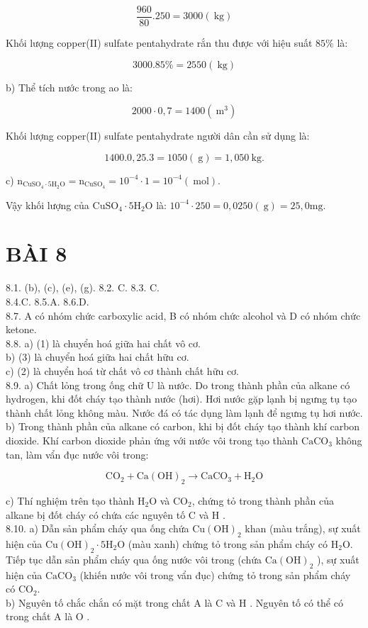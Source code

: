\documentclass[10pt]{article}
\begin{document}
$$
\frac{960}{80} .250=3000(\mathrm{~kg})
$$

Khối lượng copper(II) sulfate pentahydrate rắn thu được với hiệu suất $85 \%$ là:

$$
3000.85 \%=2550(\mathrm{~kg})
$$

b) Thể tích nước trong ao là:

$$
2000 \cdot 0,7=1400\left(\mathrm{~m}^{3}\right)
$$

Khối lượng copper(II) sulfate pentahydrate người dân cần sử dụng là:

$$
1400.0,25.3=1050(\mathrm{~g})=1,050 \mathrm{~kg} .
$$

c) $\mathrm{n}_{\mathrm{CuSO}_{4} \cdot 5 \mathrm{H}_{2} \mathrm{O}}=\mathrm{n}_{\mathrm{CuSO}_{4}}=10^{-4} \cdot 1=10^{-4}(\mathrm{~mol})$.

Vậy khối lượng của $\mathrm{CuSO}_{4} \cdot 5 \mathrm{H}_{2} \mathrm{O}$ là: $10^{-4} \cdot 250=0,0250(\mathrm{~g})=25,0 \mathrm{mg}$.

\section*{BÀI 8}
8.1. (b), (c), (e), (g). 8.2. C. 8.3. C.\\
8.4.C. 8.5.A. 8.6.D.\\
8.7. A có nhóm chức carboxylic acid, B có nhóm chức alcohol và D có nhóm chức ketone.\\
8.8. a) (1) là chuyển hoá giữa hai chất vô cơ.\\
b) (3) là chuyển hoá giữa hai chất hữu cơ.\\
c) (2) là chuyển hoá từ chất vô cơ thành chất hữu cơ.\\
8.9. a) Chất lỏng trong ống chữ U là nước. Do trong thành phần của alkane có hydrogen, khi đốt cháy tạo thành nước (hơi). Hơi nước gặp lạnh bị ngưng tụ tạo thành chất lỏng không màu. Nước đá có tác dụng làm lạnh để ngưng tụ hơi nước.\\
b) Trong thành phần của alkane có carbon, khi bị đốt cháy tạo thành khí carbon dioxide. Khí carbon dioxide phản ứng với nước vôi trong tạo thành $\mathrm{CaCO}_{3}$ không tan, làm vẩn đục nước vôi trong:

$$
\mathrm{CO}_{2}+\mathrm{Ca}(\mathrm{OH})_{2} \rightarrow \mathrm{CaCO}_{3}+\mathrm{H}_{2} \mathrm{O}
$$

c) Thí nghiệm trên tạo thành $\mathrm{H}_{2} \mathrm{O}$ và $\mathrm{CO}_{2}$, chứng tỏ trong thành phần của alkane bị đốt cháy có chứa các nguyên tố C và H .\\
8.10. a) Dẫn sản phẩm cháy qua ống chứa $\mathrm{Cu}(\mathrm{OH})_{2}$ khan (màu trắng), sự xuất hiện của $\mathrm{Cu}(\mathrm{OH})_{2} \cdot 5 \mathrm{H}_{2} \mathrm{O}$ (màu xanh) chứng tỏ trong sản phẩm cháy có $\mathrm{H}_{2} \mathrm{O}$. Tiếp tục dẫn sản phẩm cháy qua ống nước vôi trong (chứa $\mathrm{Ca}(\mathrm{OH})_{2}$ ), sự xuất hiện của $\mathrm{CaCO}_{3}$ (khiến nước vôi trong vẩn đục) chứng tỏ trong sản phẩm cháy có $\mathrm{CO}_{2}$.\\
b) Nguyên tố chắc chắn có mặt trong chất A là C và H . Nguyên tố có thể có trong chất A là O .
\end{document}
